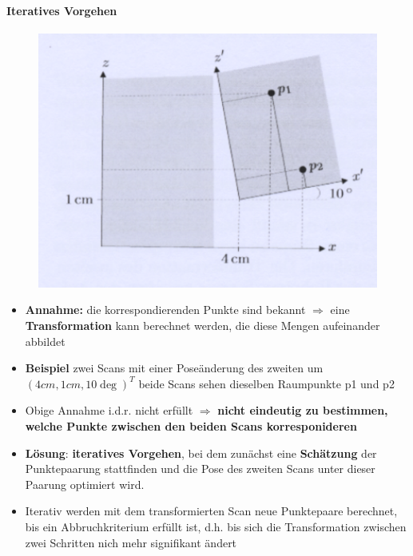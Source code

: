 \paragraph{Iteratives Vorgehen}
\begin{figure}[]
	\begin{center}
		\includegraphics[scale=0.3]{Resources/PNG/2DScan.PNG}
		\caption{}
		\label{fig:PNG/2DScan.PNG}
	\end{center}
\end{figure}	
\begin{itemize}
	\item \textbf{Annahme:} die korrespondierenden Punkte sind bekannt $\Rightarrow$ eine \textbf{Transformation} kann berechnet werden, die diese Mengen aufeinander abbildet
	\item \textbf{Beispiel} zwei Scans mit einer Poseänderung des zweiten um $(4cm, 1cm, 10 \deg)^T$ beide Scans sehen dieselben Raumpunkte p1 und p2
	\item Obige Annahme i.d.r. nicht erfüllt $\Rightarrow$ \textbf{nicht eindeutig zu bestimmen, welche Punkte zwischen den beiden Scans korresponideren}
	\item \textbf{Lösung}: \textbf{iteratives Vorgehen}, bei dem zunächst eine \textbf{Schätzung} der Punktepaarung stattfinden und die Pose des zweiten Scans unter dieser Paarung optimiert wird.
	\item Iterativ werden mit dem transformierten Scan neue Punktepaare berechnet, bis ein Abbruchkriterium erfüllt ist, d.h. bis sich die Transformation zwischen zwei Schritten nich mehr signifikant ändert
\end{itemize}
